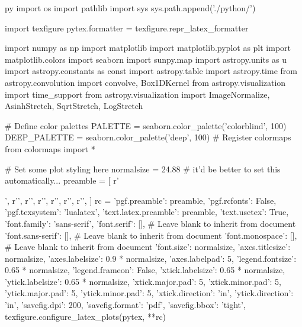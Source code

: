 \begin{pythontexcustomcode}{py}
import os
import pathlib
import sys
sys.path.append('./python/')

import texfigure
pytex.formatter = texfigure.repr_latex_formatter

import numpy as np
import matplotlib
import matplotlib.pyplot as plt
import matplotlib.colors
import seaborn
import sunpy.map
import astropy.units as u
import astropy.constants as const
import astropy.table
import astropy.time
from astropy.convolution import convolve, Box1DKernel
from astropy.visualization import time_support
from astropy.visualization import ImageNormalize, AsinhStretch, SqrtStretch, LogStretch

# Define color palettes
PALETTE = seaborn.color_palette('colorblind', 100)
DEEP_PALETTE = seaborn.color_palette('deep', 100)
# Register colormaps
from colormaps import *

# Set some plot styling here
normalsize = 24.88  # it'd be better to set this automatically...
preamble = [
	r'\usepackage{siunitx}',
	r'\DeclareSIUnit[number-unit-product={}]',
	r'\DeclareSIUnit[number-unit-product={}]',
	r'\DeclareSIUnit[number-unit-product={}]',
	r'\DeclareSIUnit[number-unit-product={}]',
	r'\DeclareSIUnit[number-unit-product={}]',
	r'\DeclareSIUnit[number-unit-product={}]',
]
rc = {
	'pgf.preamble': preamble,
	'pgf.rcfonts': False,
	'pgf.texsystem': 'lualatex',
	'text.latex.preamble': preamble,
	'text.usetex': True,
	'font.family': 'sans-serif',
	'font.serif': [], # Leave blank to inherit from document
	'font.sans-serif': [], # Leave blank to inherit from document
	'font.monospace': [], # Leave blank to inherit from document
	'font.size': normalsize,
	'axes.titlesize': normalsize,
	'axes.labelsize': 0.9 * normalsize,
	'axes.labelpad': 5,
	'legend.fontsize': 0.65 * normalsize,
	'legend.frameon': False,
	'xtick.labelsize': 0.65 * normalsize,
	'ytick.labelsize': 0.65 * normalsize,
	'xtick.major.pad': 5,
	'xtick.minor.pad': 5,
	'ytick.major.pad': 5,
	'ytick.minor.pad': 5,
	'xtick.direction': 'in',
	'ytick.direction': 'in',
	'savefig.dpi': 200,
	'savefig.format': 'pdf',
	'savefig.bbox': 'tight',
}
texfigure.configure_latex_plots(pytex, **rc)

\end{pythontexcustomcode}
